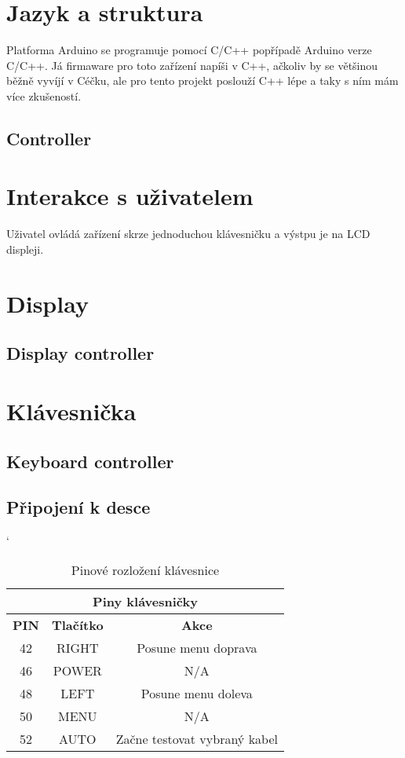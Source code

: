 \section{Jazyk a struktura}
Platforma Arduino se programuje pomocí C/C++ popřípadě Arduino verze C/C++. Já firmaware pro toto zařízení napíši v C++, ačkoliv by se většinou běžně vyvíjí v Céčku, ale pro tento projekt poslouží C++ lépe a taky s ním mám více zkušeností.
\newpage
\subsection{Controller}


\section{Interakce s uživatelem}
Uživatel ovládá zařízení skrze jednoduchou klávesničku a výstpu je na LCD displeji.

\newpage
\section{Display}
\subsection{Display controller}


\newpage
\section{Klávesnička}
\subsection{Keyboard controller}


\subsection{Připojení k desce}
\begin{table} [h!]
	\centering
	\catcode` %
	\begin{tabular}[c]{|| c | c | c ||}
	\hline
		\multicolumn{3}{||c||}{Piny klávesničky} \\
	\hline
 		 \textbf{PIN} & \textbf{Tlačítko} & \textbf{Akce}\\
	\hline
		42 &  RIGHT & Posune menu doprava\\
	\hline
		46 & POWER & N/A\\
	\hline
		48 & LEFT & Posune menu doleva\\
	\hline
		50 & MENU & N/A\\
	\hline
		52 & AUTO & Začne testovat vybraný kabel\\
	\hline
	\end{tabular}
	\caption{Pinové rozložení klávesnice}
	\label{table:pinKB}
\end{table}

